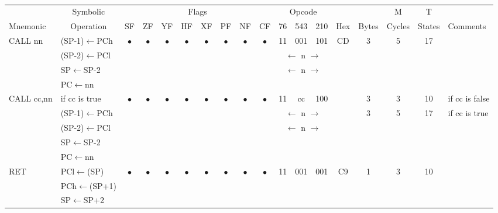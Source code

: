 \documentclass[oneside,a4paper]{book}
\begin{document}
{\tt \scriptsize \setlength{\fboxsep}{0.25mm}
\setlength{\tabcolsep}{1mm}
\begin{tabular}{llc@{ }c@{ }c@{ }c@{ }c@{ }c@{ }c@{ }cc@{ }c@{ }cccccll}\hline
 & \multicolumn{1}{c}{Symbolic} & \multicolumn{8}{c}{Flags} & \multicolumn{3}{c}{Opcode} & & & M & T & \\
Mnemonic & \multicolumn{1}{c}{Operation} & SF & ZF & YF & HF & XF & PF & NF & CF & 76 & 543 & 210 
	& Hex & Bytes & Cycles & States & \multicolumn{2}{l}{Comments} \\ \hline

CALL nn & (SP-1)$\leftarrow$PCh &
	$\bullet$ & $\bullet$ & $\bullet$ & $\bullet$ & $\bullet$ & $\bullet$ & $\bullet$ & $\bullet$ & 11 & 001 & 101 
	& CD & 3 & 5 & 17 &  & \\
	& (SP-2)$\leftarrow$PCl & \multicolumn{8}{c}{} & \multicolumn{3}{c}{$\leftarrow$ n $\rightarrow$} & & & &  &  & \\
	& SP$\leftarrow$SP-2 & \multicolumn{8}{c}{} & \multicolumn{3}{c}{$\leftarrow$ n $\rightarrow$} & & & &  &  & \\
	& PC$\leftarrow$nn & \multicolumn{8}{c}{} & \multicolumn{3}{c}{} & & & &  &  & \\

CALL cc,nn & if cc is true &
	$\bullet$ & $\bullet$ & $\bullet$ & $\bullet$ & $\bullet$ & $\bullet$ & $\bullet$ & $\bullet$ & 11 & cc & 100 
	& & 3 & 3 & 10 & \multicolumn{2}{l}{if cc is false} \\
	& (SP-1)$\leftarrow$PCh & \multicolumn{8}{c}{} & \multicolumn{3}{c}{$\leftarrow$ n $\rightarrow$} & & 3 & 5 & 17 & 
		\multicolumn{2}{l}{if cc is true} \\
	& (SP-2)$\leftarrow$PCl & \multicolumn{8}{c}{} & \multicolumn{3}{c}{$\leftarrow$ n $\rightarrow$} & & & &  &  & \\
	& SP$\leftarrow$SP-2 & \multicolumn{8}{c}{} & \multicolumn{3}{c}{} & & & &  &  & \\
	& PC$\leftarrow$nn & \multicolumn{8}{c}{} & \multicolumn{3}{c}{} & & & &  &  & \\

RET & PCl$\leftarrow$(SP) &
	$\bullet$ & $\bullet$ & $\bullet$ & $\bullet$ & $\bullet$ & $\bullet$ & $\bullet$ & $\bullet$ & 11 & 001 & 001
	& C9 & 1 & 3 & 10 &  & \\
	& PCh$\leftarrow$(SP+1) & \multicolumn{8}{c}{} & \multicolumn{3}{c}{} & & & &  &  & \\
	& SP$\leftarrow$SP+2 & \multicolumn{8}{c}{} & \multicolumn{3}{c}{} & & & &  &  & \\


\end{tabular}}
\end{document}
